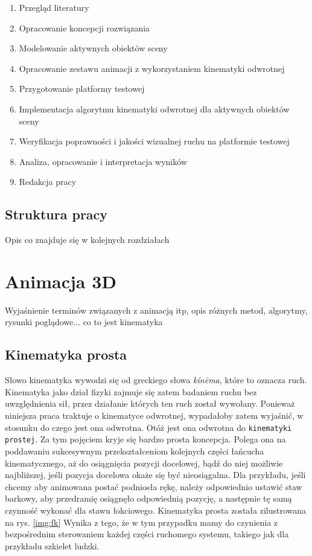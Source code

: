 \documentclass[11pt]{mwrep}
\begin{document}
\begin{enumerate}

\item Przegląd literatury
\item Opracowanie koncepcji rozwiązania
\item Modelowanie aktywnych obiektów sceny
\item Opracowanie zestawu animacji z wykorzystaniem kinematyki odwrotnej
\item Przygotowanie platformy testowej
\item Implementacja algorytmu kinematyki odwrotnej dla aktywnych obiektów sceny
\item Weryfikacja poprawności i jakości wizualnej ruchu na platformie testowej
\item Analiza, opracowanie i interpretacja wyników
\item Redakcja pracy

\end{enumerate}

  \section{Struktura pracy}

Opis co znajduje się w kolejnych rozdziałach

\chapter{Animacja 3D}

Wyjaśnienie terminów związanych z animacją itp, opis różnych metod, algorytmy, rysunki poglądowe...
co to jest kinematyka

  \section{Kinematyka prosta}

 Słowo kinematyka wywodzi się od greckiego słowa \textit{kín\={e}ma}, które to oznacza ruch. Kinematyka jako dział fizyki zajmuje się zatem badaniem ruchu bez uwzględnienia sił, przez działanie których ten ruch został wywołany. Ponieważ niniejsza praca traktuje o kinematyce odwrotnej, wypadałoby zatem wyjaśnić, w stosunku do czego jest ona odwrotna. Otóż jest ona odwrotna do \texttt{kinematyki prostej}. Za tym pojęciem kryje się bardzo prosta koncepcja. Polega ona na poddawaniu sukcesywnym przekształceniom kolejnych części łańcucha kinematycznego, aż do osiągnięcia pozycji docelowej, bądź do niej możliwie najbliższej, jeśli pozycja docelowa okaże się być nieosiągalna. Dla przykładu,  jeśli chcemy aby animowana postać podniosła rękę, należy odpowiednio ustawić staw barkowy, aby przedramię osiągnęło odpowiednią pozycję, a następnie tę samą czynność wykonać dla stawu łokciowego. Kinematyka prosta została zilustrowana na rys. \ref{img:fk} Wynika z tego, że w tym przypadku mamy do czynienia z bezpośrednim sterowaniem każdej części ruchomego systemu, takiego jak dla przykładu szkielet ludzki.
  
\end{document}
